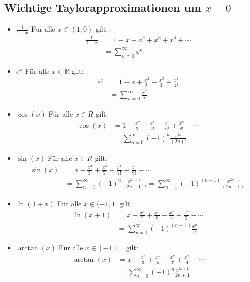 \documentclass[25pt]{sciposter}
\newcommand{\R}{\mathbb{R}}
\begin{document}
\begin{multicols}{3}
\subsection*{Wichtige Taylorapproximationen um $x=0$}
\begin{itemize}
	\item $\boxed{\frac{1}{1-x}}$ Für alle $x \in (1,0)$ gilt:
	\begin{align*}
	{\frac{1}{1-x}} &= 1 + x + x^2 + x^3 + x^4 + \cdots \\
	&= \sum_{n=0}^{\infty} x^n
	\end{align*}	
	
	\item $\boxed{e^x}$ Für alle $x \in \R$ gilt:
	\begin{align*}
		e^x &= 1 + x + \frac{x^2}{2!} + \frac{x^3}{3!} + \frac{x^4}{4!}\\
		&= \sum_{n=0}^{\infty} \frac{x^n}{n!}
	\end{align*}
	
	\item $\boxed{\cos(x)}$ Für alle $x\in R$ gilt:
	\begin{align*}
	\cos(x) &= 1 - \frac{x^2}{2!} + \frac{x^4}{4!} - \frac{x^6}{6!} + \frac{x^8}{8!} - \cdots  \\
	&= \sum_{n=0}^{\infty} (-1)^n \frac{x^{2n}}{(2n)!}
	\end{align*}
	
	\item $\boxed{\sin(x)}$ Für alle $x\in R$ gilt:
	\begin{align*}
	\sin(x) &=  x - \frac{x^3}{3!} + \frac{x^5}{5!} - \frac{x^7}{7!} + \frac{x^9}{9!} - \cdots\\
	&= \sum_{n=0}^{\infty} (-1)^n \frac{x^{2n+1}}{(2n+1)!} = \sum_{n=1}^{\infty} (-1)^{(n-1)} \frac{x^{2n-1}}{(2n-1)!}
	\end{align*}

	\item $\boxed{\ln(1+x)}$ Für alle $x\in (-1,1]$ gilt:
	\begin{align*}
	\ln(x+1) &= x - \frac{x^2}{2} + \frac{x^3}{3} - \frac{x^4}{4} + \frac{x^5}{5}- \cdots \\
	&= \sum_{n=1}^{\infty} (-1)^{(n+1)} \frac{x^n}{n}
	\end{align*}

	\item $\boxed{\arctan(x)}$ Für alle $x\in [-1,1]$ gilt:
	\begin{align*}
	\arctan(x) &= x - \frac{x^3}{3} + \frac{x^5}{5} - \frac{x^7}{7} + \frac{x^9}{9} - \cdots \\
	&= \sum_{n=0}^{\infty} (-1)^n \frac{x^{2n+1}}{2n+1}
	\end{align*}


\end{itemize}
\end{multicols}
\end{document}
